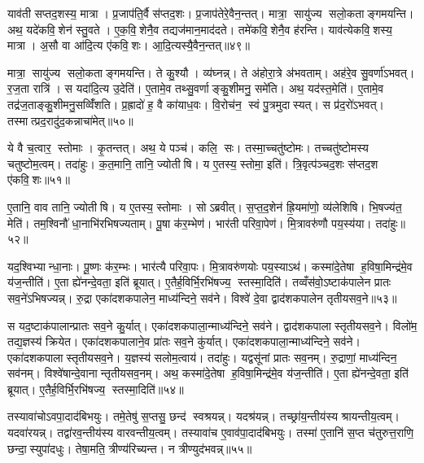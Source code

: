 याव॑ती सप्तद॒शस्य॒ मात्रा। प्र॒जाप॑ति॒र्वै स॑प्तद॒शः। प्र॒जाप॑तेरे॒वैन॒न्तत्। मात्रा॒ सायु॑ज्य सलो॒कताङ्गमयन्ति। अथ॒ यदे॑कवि॒शेन॑ स्तु॒वते। ए॒क॒वि॒शेनै॒व तद्यज॑मान॒माद॑दते। तमे॑कवि॒शेनै॒व ह॑रन्ति। याव॑त्येकवि॒शस्य॒ मात्रा। अ॒सौ वा आ॑दि॒त्य ए॑कवि॒शः। आ॒दि॒त्यस्यै॒वैन॒न्तत्॥४९॥

मात्रा॒ सायु॑ज्य सलो॒कताङ्गमयन्ति। ते कु॒श्यौ। व्य॑घ्नन्न्। ते अ॑होरा॒त्रे अ॑भवताम्। अह॑रे॒व सु॒वर्णा॑ऽभवत्। र॒ज॒ता रात्रि॑। स यदा॑दि॒त्य उ॒देति॑। ए॒तामे॒व तथ्सु॒वर्णाङ्कु॒शीमनु॒ समे॑ति। अथ॒ यद॑स्त॒मेति॑। ए॒तामे॒व तद्र॑ज॒ताङ्कु॒शीमनु॒सव्विँ॑शति। प्र॒ह्रादो॑ ह॒ वै का॑याध॒वः। वि॒रोच॑न॒ स्वं पु॒त्रमुदास्यत्। स प्र॑द॒रो॑ऽभवत्। तस्मात्प्रद॒रादु॑द॒कन्नाचा॑मेत्॥५०॥\anuvakamend[आ॒दि॒त्यः प॑ञ्चद॒शस्य॒ मात्रा स्तु॒वते॑ पञ्चद॒शेनै॒व तद्यज॑मान॒माद॑दते सप्तद॒शेनै॒व ह॑रन्त्यादि॒त्यस्यै॒वैनं॒ तद्वि॑शति च॒त्वारि॑ च]

ये वै च॒त्वार॒ स्तोमाः। कृ॒तन्तत्। अथ॒ ये पञ्च॑। कलि॒ सः। तस्मा॒च्चतु॑ष्टोमः। तच्चतु॑ष्टोमस्य चतुष्टोम॒त्वम्। तदा॑हुः। क॒त॒मानि॒ तानि॒ ज्योतीषि। य ए॒तस्य॒ स्तोमा॒ इति॑। त्रि॒वृत्प॑ञ्चद॒शः स॑प्तद॒श ए॑कवि॒शः॥५१॥

ए॒तानि॒ वाव तानि॒ ज्योतीषि। य ए॒तस्य॒ स्तोमाः। सोऽब्रवीत्। स॒प्त॒द॒शेन॑ ह्रि॒यमा॑णो॒ व्य॑लेशिषि। भि॒षज्य॑त॒ मेति॑। तम॒श्विनौ॑ धा॒नाभि॑रभिषज्यताम्। पू॒षा क॑र॒म्भेण॑। भार॑ती परिवा॒पेण॑। मि॒त्रावरु॑णौ पय॒स्य॑या। तदा॑हुः॥५२॥

यद॒श्विभ्यान्धा॒नाः। पू॒ष्णः क॑र॒म्भः। भार॑त्यै परिवा॒पः। मि॒त्रावरु॑णयोः पय॒स्याऽथ॑। कस्मा॑दे॒तेषा ह॒विषा॒मिन्द्र॑मे॒व य॑ज॒न्तीति॑। ए॒ता ह्ये॑नन्दे॒वता॒ इति॑ ब्रूयात्। ए॒तैर्\mbox{}ह॒विर्भि॒रभि॑षज्य॒ स्तस्मा॒दिति॑। तव्वँस॑वो॒ऽष्टाक॑पालेन प्रातः सव॒ने॑ऽभिषज्यन्न्। रु॒द्रा एका॑दशकपालेन॒ माध्य॑न्दिने॒ सव॑ने। विश्वे॑ दे॒वा द्वाद॑शकपालेन तृतीयसव॒ने॥५३॥

स यद॒ष्टाक॑पालान्प्रातः सव॒ने कु॒र्यात्। एका॑दशकपाला॒न्माध्य॑न्दिने॒ सव॑ने। द्वाद॑शकपालास्तृतीयसव॒ने। विलो॑म॒ तद्य॒ज्ञस्य॑ क्रियेत। एका॑दशकपालाने॒व प्रा॑तः सव॒ने कु॑र्यात्। एका॑दशकपाला॒न्माध्य॑न्दिने॒ सव॑ने। एका॑दशकपालास्तृतीयसव॒ने। य॒ज्ञस्य॑ सलोम॒त्वाय॑। तदा॑हुः। यद्वसू॑नां प्रातः सव॒नम्। रु॒द्राणां॒ माध्य॑न्दिन॒ सव॑नम्। विश्वे॑षान्दे॒वानान्तृतीयसव॒नम्। अथ॒ कस्मा॑दे॒तेषा ह॒विषा॒मिन्द्र॑मे॒व य॑ज॒न्तीति॑। ए॒ता ह्ये॑नन्दे॒वता॒ इति॑ ब्रूयात्। ए॒तैर्\mbox{}ह॒विर्भि॒रभि॑षज्य॒ स्तस्मा॒दिति॑॥५४॥\anuvakamend[ए॒क॒वि॒श आ॑हुस्तृतीयसव॒ने प्रा॑तः सव॒नं पञ्च॑ च]

तस्यावा॑चोऽवपा॒दाद॑बिभयुः। तमे॒तेषु॑ स॒प्तसु॒ छन्द॑ स्वश्रयन्न्। यदश्र॑यन्न्। तच्छ्रा॑य॒न्तीय॑स्य श्रायन्तीय॒त्वम्। यदवा॑रयन्न्। तद्वा॑रव॒न्तीय॑स्य वारवन्तीय॒त्वम्। तस्यावा॑च ए॒वाव॑पा॒दाद॑बिभयुः। तस्मा॑ ए॒तानि॑ स॒प्त च॑तुरुत्त॒राणि॒ छन्दा॒स्युपा॑दधुः। तेषा॒मति॒ त्रीण्य॑रिच्यन्त। न त्रीण्युद॑भवन्न्॥५५॥

